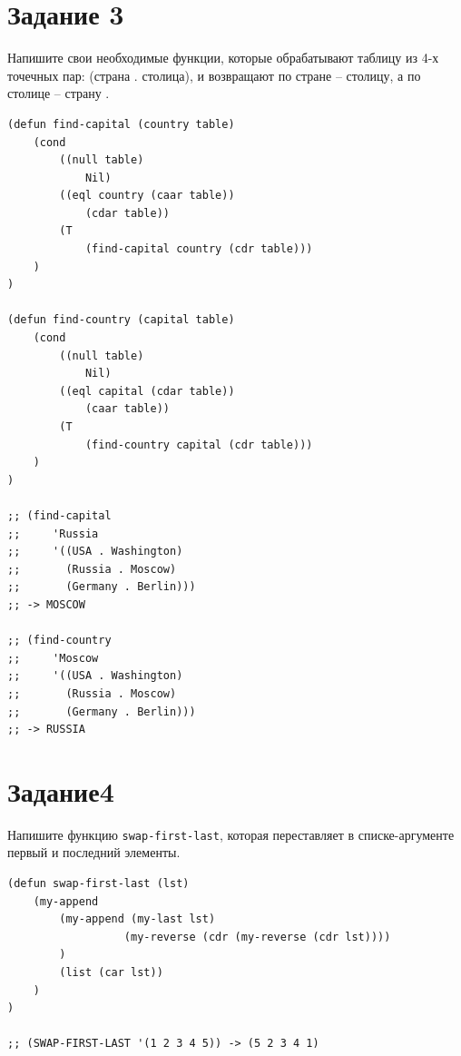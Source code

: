 \documentclass[a4paper,14pt, unknownkeysallowed]{extreport}
\begin{document}
\clearpage

\section{Задание 3}

Напишите свои необходимые функции, которые обрабатывают таблицу из 4-х точечных пар: (страна . столица), и возвращают по стране -- столицу, а по столице -- страну .

\begin{center}
\captionsetup{justification=raggedright,singlelinecheck=off}
\begin{lstlisting}[label=lst:parallel_processing,caption=Решение задания 3]
(defun find-capital (country table) 
    (cond 
        ((null table) 
            Nil)
        ((eql country (caar table)) 
            (cdar table)) 
        (T 
            (find-capital country (cdr table)))
    )
)

(defun find-country (capital table) 
    (cond 
        ((null table) 
            Nil)
        ((eql capital (cdar table)) 
            (caar table)) 
        (T 
            (find-country capital (cdr table)))
    )
)

;; (find-capital
;;     'Russia
;;     '((USA . Washington)
;;       (Russia . Moscow)
;;       (Germany . Berlin)))
;; -> MOSCOW

;; (find-country
;;     'Moscow
;;     '((USA . Washington)
;;       (Russia . Moscow)
;;       (Germany . Berlin)))
;; -> RUSSIA
\end{lstlisting}
\end{center}

\section{Задание4}

Напишите функцию \texttt{swap-first-last}, которая переставляет в списке-аргументе первый и последний элементы.

\begin{center}
\captionsetup{justification=raggedright,singlelinecheck=off}
\begin{lstlisting}[label=lst:parallel_processing,caption=Решение задания 4]
(defun swap-first-last (lst)
    (my-append
        (my-append (my-last lst) 
                  (my-reverse (cdr (my-reverse (cdr lst))))
        )
        (list (car lst))
    )
) 

;; (SWAP-FIRST-LAST '(1 2 3 4 5)) -> (5 2 3 4 1)

\end{lstlisting}
\end{center}
\end{document}
